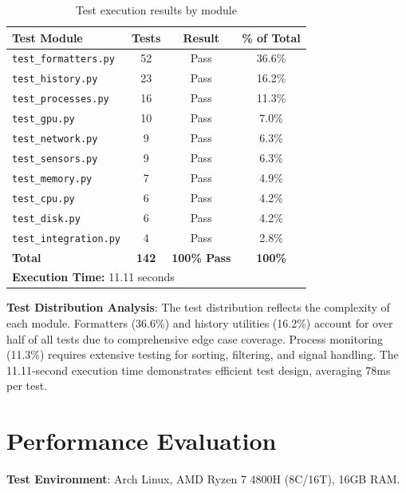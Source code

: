 \documentclass[12pt,a4paper,oneside]{report}
\begin{document}
\begin{table}[h]
\centering
\caption{Test execution results by module}
\label{tab:test-execution}
\small
\begin{tabular}{|l|c|c|c|}
\hline
\textbf{Test Module} & \textbf{Tests} & \textbf{Result} & \textbf{\% of Total} \\
\hline
\texttt{test\_formatters.py} & 52 & Pass & 36.6\% \\
\texttt{test\_history.py} & 23 & Pass & 16.2\% \\
\texttt{test\_processes.py} & 16 & Pass & 11.3\% \\
\texttt{test\_gpu.py} & 10 & Pass & 7.0\% \\
\texttt{test\_network.py} & 9 & Pass & 6.3\% \\
\texttt{test\_sensors.py} & 9 & Pass & 6.3\% \\
\texttt{test\_memory.py} & 7 & Pass & 4.9\% \\
\texttt{test\_cpu.py} & 6 & Pass & 4.2\% \\
\texttt{test\_disk.py} & 6 & Pass & 4.2\% \\
\texttt{test\_integration.py} & 4 & Pass & 2.8\% \\
\hline
\textbf{Total} & \textbf{142} & \textbf{100\% Pass} & \textbf{100\%} \\
\hline
\multicolumn{4}{|l|}{\textbf{Execution Time:} 11.11 seconds} \\
\hline
\end{tabular}
\end{table}

\textbf{Test Distribution Analysis}: The test distribution reflects the complexity of each module. Formatters (36.6\%) and history utilities (16.2\%) account for over half of all tests due to comprehensive edge case coverage. Process monitoring (11.3\%) requires extensive testing for sorting, filtering, and signal handling. The 11.11-second execution time demonstrates efficient test design, averaging 78ms per test.

\section{Performance Evaluation}
\label{sec:performance-evaluation}

\textbf{Test Environment}: Arch Linux, AMD Ryzen 7 4800H (8C/16T), 16GB RAM.
\end{document}
